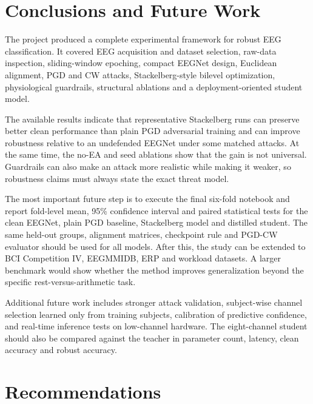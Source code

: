 \documentclass[10pt,a4paper,openright]{report}
\begin{document}
\chapter{Conclusions and Future Work}

The project produced a complete experimental framework for robust EEG classification. It covered EEG acquisition and dataset selection, raw-data inspection, sliding-window epoching, compact EEGNet design, Euclidean alignment, PGD and CW attacks, Stackelberg-style bilevel optimization, physiological guardrails, structural ablations and a deployment-oriented student model.

The available results indicate that representative Stackelberg runs can preserve better clean performance than plain PGD adversarial training and can improve robustness relative to an undefended EEGNet under some matched attacks. At the same time, the no-EA and seed ablations show that the gain is not universal. Guardrails can also make an attack more realistic while making it weaker, so robustness claims must always state the exact threat model.

The most important future step is to execute the final six-fold notebook and report fold-level mean, 95\% confidence interval and paired statistical tests for the clean EEGNet, plain PGD baseline, Stackelberg model and distilled student. The same held-out groups, alignment matrices, checkpoint rule and PGD-CW evaluator should be used for all models. After this, the study can be extended to BCI Competition IV, EEGMMIDB, ERP and workload datasets. A larger benchmark would show whether the method improves generalization beyond the specific rest-versus-arithmetic task.

Additional future work includes stronger attack validation, subject-wise channel selection learned only from training subjects, calibration of predictive confidence, and real-time inference tests on low-channel hardware. The eight-channel student should also be compared against the teacher in parameter count, latency, clean accuracy and robust accuracy.

\chapter{Recommendations}
\end{document}
